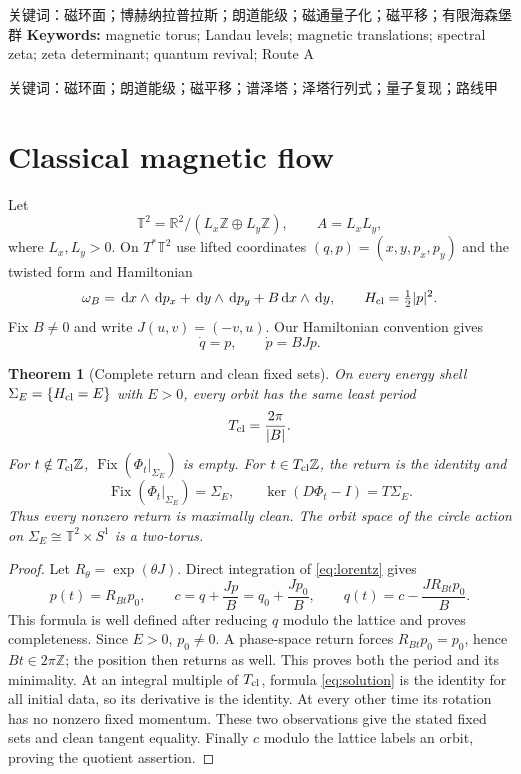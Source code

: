 \documentclass[10pt]{article}
\newcommand{\RR}{\mathbb R}
\newcommand{\ZZ}{\mathbb Z}
\newcommand{\TT}{\mathbb T}
\newcommand{\dd}{\,\mathrm d}
\newcommand{\Fix}{\operatorname{Fix}}
\newtheorem{theorem}{Theorem}
\begin{document}
{\cjkfont\noindent 关键词：磁环面；博赫纳拉普拉斯；朗道能级；磁通量子化；磁平移；有限海森堡群}
\else
\noindent\textbf{Keywords:} magnetic torus; Landau levels; magnetic translations; spectral zeta; zeta determinant; quantum revival; Route A

{\cjkfont\noindent 关键词：磁环面；朗道能级；磁平移；谱泽塔；泽塔行列式；量子复现；路线甲}
\fi

\section{Classical magnetic flow}

Let
\[
 \TT^2=\RR^2/(L_x\ZZ\oplus L_y\ZZ),\qquad A=L_xL_y,
\]
where $L_x,L_y>0$.  On $T^*\TT^2$ use lifted coordinates
$(q,p)=(x,y,p_x,p_y)$ and the twisted form and Hamiltonian
\begin{equation}
 \omega_B=\dd x\wedge\dd p_x+\dd y\wedge\dd p_y
       +B\dd x\wedge\dd y,
 \qquad H_{\rm cl}=\tfrac12|p|^2.                 \label{eq:classical}
\end{equation}
Fix $B\ne0$ and write $J(u,v)=(-v,u)$.  Our Hamiltonian convention gives
\begin{equation}
 \dot q=p,\qquad \dot p=BJp.                     \label{eq:lorentz}
\end{equation}

\begin{theorem}[Complete return and clean fixed sets]\label{thm:classical}
On every energy shell $\Sigma_E=\{H_{\rm cl}=E\}$ with $E>0$, every orbit
has the same least period
\[
 T_{\rm cl}=\frac{2\pi}{|B|}.
\]
For $t\notin T_{\rm cl}\ZZ$, $\Fix(\Phi_t|_{\Sigma_E})$ is empty.  For
$t\in T_{\rm cl}\ZZ$, the return is the identity and
\[
 \Fix(\Phi_t|_{\Sigma_E})=\Sigma_E,\qquad
 \ker(D\Phi_t-I)=T\Sigma_E.
\]
Thus every nonzero return is maximally clean.  The orbit space of the
circle action on $\Sigma_E\cong\TT^2\times S^1$ is a two-torus.
\end{theorem}

\begin{proof}
Let $R_\theta=\exp(\theta J)$.  Direct integration of
\eqref{eq:lorentz} gives
\begin{equation}
 p(t)=R_{Bt}p_0,\qquad
 c=q+\frac{Jp}{B}=q_0+\frac{Jp_0}{B},\qquad
 q(t)=c-\frac{J R_{Bt}p_0}{B}.                   \label{eq:solution}
\end{equation}
This formula is well defined after reducing $q$ modulo the lattice and
proves completeness.  Since $E>0$, $p_0\ne0$.  A phase-space return forces
$R_{Bt}p_0=p_0$, hence $Bt\in2\pi\ZZ$; the position then returns as well.
This proves both the period and its minimality.  At an integral multiple of
$T_{\rm cl}$, formula \eqref{eq:solution} is the identity for all initial
data, so its derivative is the identity.  At every other time its rotation
has no nonzero fixed momentum.  These two observations give the stated
fixed sets and clean tangent equality.  Finally $c$ modulo the lattice
labels an orbit, proving the quotient assertion.
\end{proof}
\end{document}

